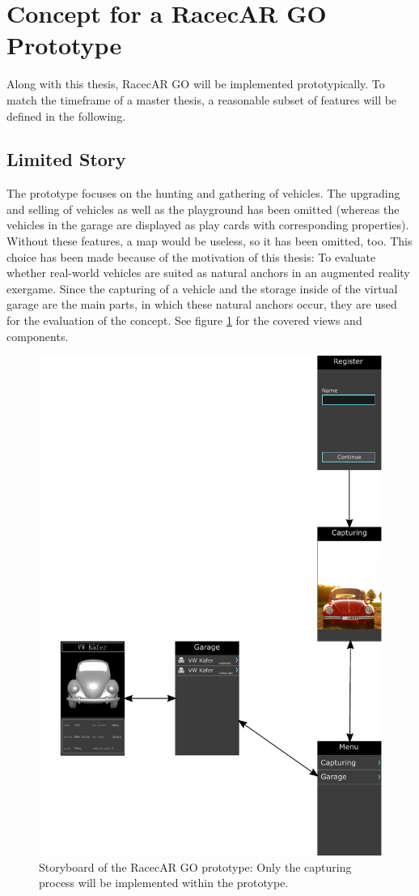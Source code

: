 \section{Concept for a RacecAR GO Prototype}
Along with this thesis, RacecAR GO will be implemented prototypically. To match the timeframe of a master thesis, a reasonable subset of features will be defined in the following.

\subsection{Limited Story}
The prototype focuses on the hunting and gathering of vehicles. The upgrading and selling of vehicles as well as the playground has been omitted (whereas the vehicles in the garage are displayed as play cards with corresponding properties). Without these features, a map would be useless, so it has been omitted, too. This choice has been made because of the motivation of this thesis: To evaluate whether real-world vehicles are suited as natural anchors in an augmented reality exergame. Since the capturing of a vehicle and the storage inside of the virtual garage are the main parts, in which these natural anchors occur, they are used for the evaluation of the concept. See figure \ref{fig:storyboardPrototype} for the covered views and components.

\begin{figure}[btph]
  \centering
        \includegraphics[width=.6\linewidth]{gfx/storyboard_limited}
        \caption{Storyboard of the RacecAR GO prototype: Only the capturing process will be implemented within the prototype.}
        \label{fig:storyboardPrototype}
\end{figure}

